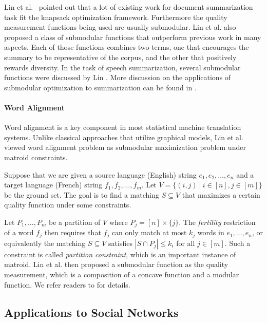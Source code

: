 Lin et al.\ \cite{LB11} pointed out that a lot of existing work for document summarization task fit the knapsack optimization framework. Furthermore the quality measurement functions being used are usually submodular. Lin et al. also proposed a class of submodular functions that outperform previous work in many aspects. Each of those functions combines two terms, one that encourages the summary to be representative of the corpus, and the other that positively rewards diversity. In the task of speech summarization, several submodular functions were discussed by Lin \cite{L12}. More discussion on the applications of submodular optimization to summarization can be found in \cite{L12}.

\paragraph{Word Alignment}
Word alignment is a key component in most statistical machine translation systems. Unlike classical approaches that utilize graphical models, Lin et al.\ \cite{LB11word} viewed word alignment problem as submodular maximization problem under matroid constraints. 

Suppose that we are given a source language (English) string $e_1, e_2, \ldots, e_n$ and a target language (French) string $f_1, f_2, \ldots, f_m$. Let $V = \{(i, j) ~|~ i\in[n], j\in[m] \}$ be the ground set. The goal is to find a matching $S\subseteq V$ that maximizes a certain quality function under some constraints. 

Let $P_1, \ldots, P_m$ be a partition of $V$ where $P_j = [n]\times \{j\}$. The \emph{fertility} restriction of a word $f_j$ then requires that $f_j$ can only match at most $k_j$ words in $e_1,\ldots, e_n$, or equivalently the matching $S \subseteq V$ satisfies $|S \cap P_j| \leq k_i$ for all $j\in[m]$. Such a constraint is called \emph{partition constraint}, which is an important instance of matroid. Lin et al. then proposed a submodular function as the quality measurement, which is a composition of a concave function and a modular function. We refer readers to \cite{LB11word} for details.





\subsection{Applications to Social Networks}
